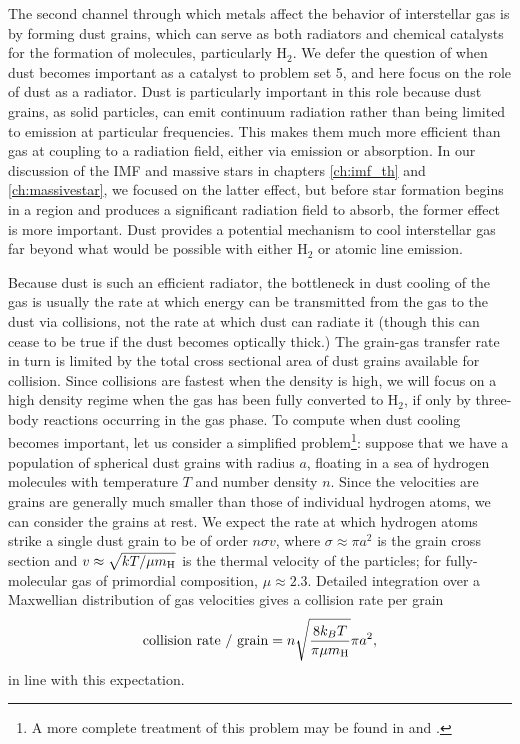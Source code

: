 The second channel through which metals affect the behavior of interstellar gas is by forming dust grains, which can serve as both radiators and chemical catalysts for the formation of molecules, particularly H$_2$. We defer the question of when dust becomes important as a catalyst to problem set 5, and here focus on the role of dust as a radiator. Dust is particularly important in this role because dust grains, as solid particles, can emit continuum radiation rather than being limited to emission at particular frequencies. This makes them much more efficient than gas at coupling to a radiation field, either via emission or absorption. In our discussion of the IMF and massive stars in chapters \ref{ch:imf_th} and \ref{ch:massivestar}, we focused on the latter effect, but before star formation begins in a region and produces a significant radiation field to absorb, the former effect is more important. Dust provides a potential mechanism to cool interstellar gas far beyond what would be possible with either H$_2$ or atomic line emission.

Because dust is such an efficient radiator, the bottleneck in dust cooling of the gas is usually the rate at which energy can be transmitted from the gas to the dust via collisions, not the rate at which dust can radiate it (though this can cease to be true if the dust becomes optically thick.) The grain-gas transfer rate in turn is limited by the total cross sectional area of dust grains available for collision. Since collisions are fastest when the density is high, we will focus on a high density regime when the gas has been fully converted to H$_2$, if only by three-body reactions occurring in the gas phase. To compute when dust cooling becomes important, let us consider a simplified problem\footnote{A more complete treatment of this problem may be found in \citet{schneider06a} and \citet{schneider12a}.}: suppose that we have a population of spherical dust grains with radius $a$, floating in a sea of hydrogen molecules with temperature $T$ and number density $n$. Since the velocities are grains are generally much smaller than those of individual hydrogen atoms, we can consider the grains at rest. We expect the rate at which hydrogen atoms strike a single dust grain to be of order $n\sigma v$, where $\sigma \approx \pi a^2$ is the grain cross section and $v\approx \sqrt{kT/\mu m_{\rm H}}$ is the thermal velocity of the particles; for fully-molecular gas of primordial composition, $\mu \approx 2.3$. Detailed integration over a Maxwellian distribution of gas velocities \citep{draine11a} gives a collision rate per grain
\begin{equation}
\mbox{collision rate / grain} = n \sqrt{\frac{8 k_B T}{\pi \mu m_{\rm H}}} \pi a^2,
\end{equation}
in line with this expectation.

